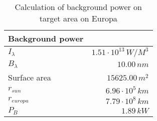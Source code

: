 \begin{table}[H]
\centering
\caption{Calculation of background power on target area on Europa}
\label{tab:background_power}
\begin{tabular}{|l|r|}\hline
    \textbf{Background power} & \\
    \hline 
    $I_\lambda$ & $1.51\cdot10^{13}\,W/M^3$ \\
    $B_\lambda$ & $10.00\,n m$ \\
    Surface area & $15625.00\, m^2$ \\
    $r_{sun}$ & $6.96\cdot10^{5}\,km$ \\
    $r_{europa}$ & $7.79\cdot10^{8}\,km$ \\
    $P_B$ & $1.89\,k W$ \\
    \hline 
\end{tabular}
\end{table}
